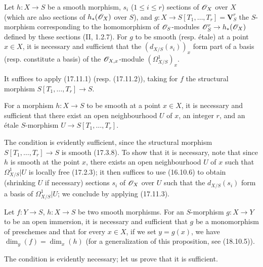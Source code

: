 \begin{corollary}[17.11.3]
\label{IV.17.11.3}
Let $h:X\to S$ be a smooth morphism, $s_i$ ($1\leq i\leq r$) sections of $\mathscr{O}_X$ over $X$ (which are also sections of $h_*(\mathscr{O}_X)$ over $S$), and $g:X\to S[T_1,\ldots,T_r]=\mathbf{V}_S^r$ the $S$-morphism corresponding to the homomorphism of $\mathscr{O}_S$-modules $\mathscr{O}_S^r\to h_*(\mathscr{O}_X)$ defined by these sections (II, 1.2.7). For $g$ to be smooth (resp. étale) at a point $x\in X$, it is necessary and sufficient that the $(d_{X/S}(s_i))_x$ form part of a basis (resp. constitute a basis) of the $\mathscr{O}_{X,x}$-module $(\Omega^1_{X/S})_x$.
\end{corollary}

It suffices to apply (17.11.1) (resp. (17.11.2)), taking for $f$ the structural morphism $S[T_1,\ldots,T_r]\to S$.

\begin{corollary}[17.11.4]
\label{IV.17.11.4}
For a morphism $h:X\to S$ to be smooth at a point $x\in X$, it is necessary and sufficient that there exist an open neighbourhood $U$ of $x$, an integer $r$, and an étale $S$-morphism $U\to S[T_1,\ldots,T_r]$.
\end{corollary}


The condition is evidently sufficient, since the structural morphism $S[T_1,\ldots,T_r]\to S$ is smooth (17.3.8). To show that it is necessary, note that since $h$ is smooth at the point $x$, there exists an open neighbourhood $U$ of $x$ such that $\Omega^1_{X/S}|U$ is locally free (17.2.3); it then suffices to use (16.10.6) to obtain (shrinking $U$ if necessary) sections $s_i$ of $\mathscr{O}_X$ over $U$ such that the $d_{X/S}(s_i)$ form a basis of $\Omega^1_{X/S}|U$; we conclude by applying (17.11.3).

\begin{proposition}[17.11.5]
\label{IV.17.11.5}
Let $f:Y\to S$, $h:X\to S$ be two smooth morphisms. For an $S$-morphism $g:X\to Y$ to be an open immersion, it is necessary and sufficient that $g$ be a monomorphism of preschemes and that for every $x\in X$, if we set $y=g(x)$, we have $\dim_y(f)=\dim_x(h)$ (for a generalization of this proposition, see (18.10.5)).
\end{proposition}

The condition is evidently necessary; let us prove that it is sufficient.

